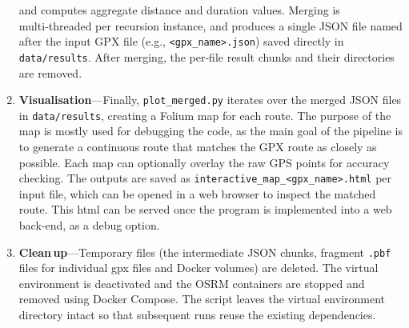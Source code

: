 \documentclass[11pt,a4paper]{article}
\begin{document}
\begin{enumerate}
	      and computes aggregate distance and duration values.  Merging is multi‑threaded per recursion instance, and produces a single JSON file named after
	      the input GPX file (e.g., \texttt{\textless gpx\_name\textgreater{}.json}) saved directly in \texttt{data/results}.  After merging,
	      the per‑file result chunks and their directories are removed.
	\item \textbf{Visualisation}---Finally, \texttt{plot\_merged.py} iterates over the merged JSON files in
	      \texttt{data/results}, creating a Folium map for each route. The purpose of the map is mostly used for debugging the code, as the main goal
	      of the pipeline is to generate a continuous route that matches the GPX route as closely as possible. Each map can optionally
	      overlay the raw GPS points for accuracy checking.  The outputs are saved as
	      \texttt{\small interactive\_map\_\textless gpx\_name\textgreater{}.html} per input file,
	      which can be opened in a web browser to inspect the matched route. This html can be served once the program is
	      implemented into a web back-end, as a debug option.
	\item \textbf{Clean\,up}---Temporary files (the intermediate JSON chunks, fragment \texttt{.pbf} files for individual gpx files and
	      Docker volumes) are deleted.  The virtual environment is deactivated and the OSRM containers are stopped and removed using Docker Compose.
	      The script leaves the virtual environment directory intact so that subsequent runs reuse the existing dependencies.
\end{enumerate}
\end{document}
